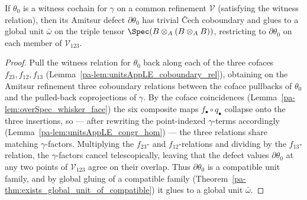 \begin{theorem}
  \label{pa-thm:exists_glued_defect}
  \leanok

  If \(\theta_0\) is a witness cochain for \(\gamma\) on a common refinement \(\mathcal V\)
  (satisfying the witness relation), then its Amitsur defect \(\partial\theta_0\) has trivial
  \v Cech coboundary and glues to a global unit \(\bar\omega\) on the triple tensor
  \(\Spec(B \otimes_A (B \otimes_A B))\), restricting to \(\partial\theta_0\) on each member of
  \(\mathcal V_{123}\).
\end{theorem}
\begin{proof}
  \leanok
  Pull the witness relation for \(\theta_0\) back along each of the three cofaces
  \(f_{23}, f_{12}, f_{13}\) (Lemma~\ref{pa-lem:unitsAppLE_coboundary_rel}), obtaining on the
  Amitsur refinement three coboundary relations between the coface pullbacks of \(\theta_0\) and
  the pulled-back coprojections of \(\gamma\). By the coface coincidences
  (Lemma~\ref{pa-lem:overSpec_whisker_face}) the six composite maps
  \(f_{\bullet} \circ q_{\bullet}\) collapse onto the three insertions, so — after rewriting the
  point-indexed \(\gamma\)-terms accordingly (Lemma~\ref{pa-lem:unitsAppLE_congr_hom}) — the three
  relations share matching \(\gamma\)-factors. Multiplying the \(f_{23}\)- and
  \(f_{12}\)-relations and dividing by the \(f_{13}\)-relation, the \(\gamma\)-factors cancel
  telescopically, leaving that the defect values \(\partial\theta_0\) at any two points of
  \(\mathcal V_{123}\) agree on their overlap. Thus \(\partial\theta_0\) is a compatible unit
  family, and by global gluing of a compatible family
  (Theorem~\ref{pa-thm:exists_global_unit_of_compatible}) it glues to a global unit \(\bar\omega\).
\end{proof}

